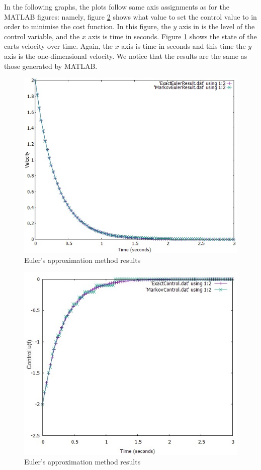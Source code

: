 \documentclass[11pt,draftd]{article}
\begin{document}
\noindent In the following graphs, the plots follow same axis assignments as for the MATLAB figures: namely, figure \ref{gnuplot-control} shows what value to set the control value to in order to minimise the cost function. In this figure, the $ y $ axis in is the level of the control variable, and the $ x $ axis is time in seconds. Figure \ref{gnuplot-state} shows the state of the carts velocity over time. Again, the $ x $ axis is time in seconds and this time the $ y $ axis is the one-dimensional velocity. We notice that the results are the same as those generated by MATLAB. 

\begin{figure}[h!]
	\centering
	\label{gnuplot-state}
	\includegraphics[scale = 0.55]{EulersApproximateStateC++}
	\caption{Euler's approximation method results}
\end{figure}
\begin{figure}[h!]
	\centering
	\label{gnuplot-control}
	\includegraphics[scale = 0.6]{EulersApproximateControlC++}
	\caption{Euler's approximation method results}
\end{figure}
\end{document}
